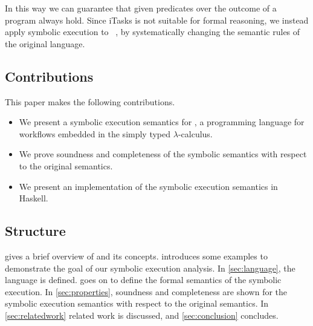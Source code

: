 In this way we can guarantee that given predicates over the outcome of a \TOP program always hold.
Since iTasks is not suitable for formal reasoning, we instead apply symbolic execution to \TOPHAT~\cite{Steenvoorden2019}, by systematically changing the semantic rules of the original language.



\subsection{Contributions}

This paper makes the following contributions.

\begin{itemize}
  \item We present a symbolic execution semantics for \TOPHAT, a programming language for workflows embedded in the simply typed $\lambda$-calculus.
  \item We prove soundness and completeness of the symbolic semantics with respect to the original \TOPHAT semantics.
  \item We present an implementation of the symbolic execution semantics in Haskell.
\end{itemize}



\subsection{Structure}

 gives a brief overview of \TOPHAT and its concepts.
 introduces some examples to demonstrate the goal of our symbolic execution analysis.
In \cref{sec:language}, the \TOPHAT language is defined.
 goes on to define the formal semantics of the symbolic execution.
In \cref{sec:properties}, soundness and completeness are shown for the symbolic execution semantics with respect to the original \TOPHAT semantics.
In \cref{sec:relatedwork} related work is discussed, and \cref{sec:conclusion} concludes.
